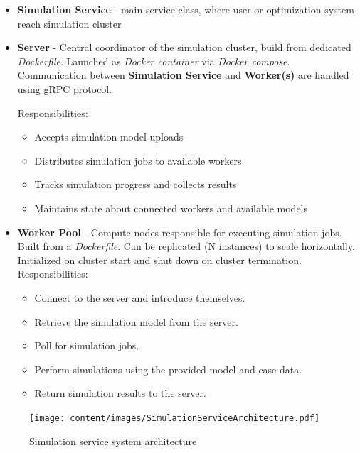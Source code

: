 \begin{itemize}
	\item \textbf{Simulation Service} - main service class, where user or optimization system reach simulation cluster

	\item \textbf{Server} - Central coordinator of the simulation cluster, build from dedicated \textit{Dockerfile}. Launched as \textit{Docker container} via \textit{Docker compose}. Communication between \textbf{Simulation Service} and \textbf{Worker(s)} are handled using gRPC protocol.

	Responsibilities:
	\begin{itemize}
		\item Accepts simulation model uploads
		\item Distributes simulation jobs to available workers
		\item Tracks simulation progress and collects results
		\item Maintains state about connected workers and available models
	\end{itemize}

	\item \textbf{Worker Pool} - Compute nodes responsible for executing simulation jobs. Built from a \textit{Dockerfile}. Can be replicated (N instances) to scale horizontally. Initialized on cluster start and shut down on cluster termination.
		Responsibilities:
	\begin{itemize}
		\item Connect to the server and introduce themselves.
		\item Retrieve the simulation model from the server.
		\item Poll for simulation jobs.
		\item Perform simulations using the provided model and case data.
		\item Return simulation results to the server.
	\end{itemize}

\end{itemize}

\begin{figure}[H]
	\centering
	\texttt{[image: content/images/SimulationServiceArchitecture.pdf]}
	\caption{Simulation service system architecture}
	\label{fig:SimulationServiceSystemArchitecture}
\end{figure}

